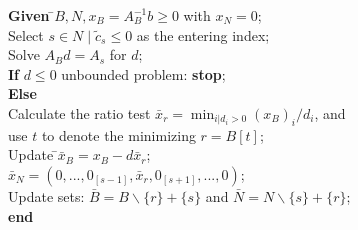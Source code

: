 \documentclass[a4paper,10 pt,titlepage,twoside]{book}
\theoremstyle{plain}
\theoremstyle{definition}
\theoremstyle{remark}
\begin{document}
\begin{tabbing}
	\textbf{Given} \=$B, N, x_{B} = A_{B}^{-1}b\geq 0$ with $x_{N}=0$;\\
	\> Select $s\in N\;|\;\widetilde{c}_{s}\leq 0$ as the entering index;\\
	\> Solve $A_{B}d = A_{s}$ for $d$;\\
	\>\textbf{If} {$d \leq 0$} unbounded problem: \textbf{stop};\\
	\>\textbf{Else} \=\\
	\>\>Calculate the ratio test $\bar{x}_{r} = \min_{i | d_{i} > 0}(x_{B})_{i}/d_{i}$, and\\
	\>\>use $t$ to denote the minimizing $r = B[t]$;\\
	\>\>Update \=$\bar{x}_{B} = x_{B}-d\bar{x}_{r}$;\\
	\>\>\>$\bar{x}_{N} = (0,...,0_{[s-1]},\bar{x}_{r},0_{[s+1]},...,0)$;\\
	\>\> Update sets: $\bar{B} = B \backslash \{r\} + \{s\}$ and $\bar{N} = N \backslash \{s\} + \{r\}$;\\
	\textbf{end}
\end{tabbing}
\end{document}
